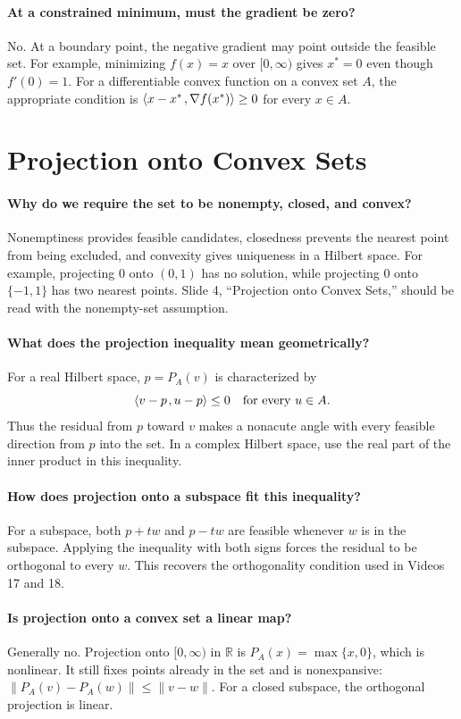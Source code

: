 \documentclass[10pt,english]{article}
\begin{document}
\paragraph{At a constrained minimum, must the gradient be zero?}
No. At a boundary point, the negative gradient may point outside the feasible set.
For example, minimizing $f(x)=x$ over $[0,\infty)$ gives $x^*=0$ even though $f'(0)=1$.
For a differentiable convex function on a convex set $A$, the appropriate condition is ${\left\langle x-x^* \mskip2mu , \nabla f(x^*) \right\rangle}\geq0$ for every $x\in A$.

\section{Projection onto Convex Sets}

\paragraph{Why do we require the set to be nonempty, closed, and convex?}
Nonemptiness provides feasible candidates, closedness prevents the nearest point from being excluded, and convexity gives uniqueness in a Hilbert space.
For example, projecting $0$ onto $(0,1)$ has no solution, while projecting $0$ onto $\{-1,1\}$ has two nearest points.
Slide 4, ``Projection onto Convex Sets,'' should be read with the nonempty-set assumption.

\paragraph{What does the projection inequality mean geometrically?}
For a real Hilbert space, $p=P_A(v)$ is characterized by
\[
{\left\langle v-p \mskip2mu , u-p \right\rangle}\leq0\quad\text{for every }u\in A.
\]
Thus the residual from $p$ toward $v$ makes a nonacute angle with every feasible direction from $p$ into the set.
In a complex Hilbert space, use the real part of the inner product in this inequality.

\paragraph{How does projection onto a subspace fit this inequality?}
For a subspace, both $p+tw$ and $p-tw$ are feasible whenever $w$ is in the subspace.
Applying the inequality with both signs forces the residual to be orthogonal to every $w$.
This recovers the orthogonality condition used in Videos 17 and 18.

\paragraph{Is projection onto a convex set a linear map?}
Generally no. Projection onto $[0,\infty)$ in $\mathbb{R}$ is $P_A(x)=\max\{x,0\}$, which is nonlinear.
It still fixes points already in the set and is nonexpansive: $\|P_A(v)-P_A(w)\|\leq\|v-w\|$.
For a closed subspace, the orthogonal projection is linear.
\end{document}
